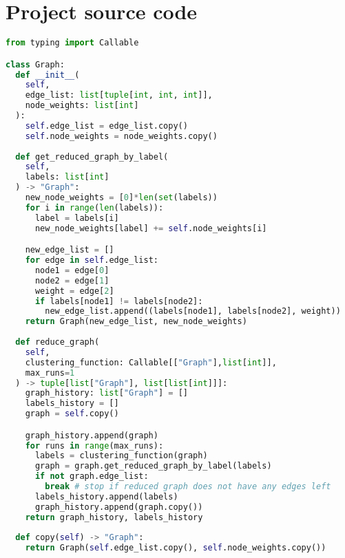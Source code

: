 \section{Project source code} \label{sec:project_source}
  \begin{lstlisting}[language=Python,caption=\texttt{graph.py},label=lst:graph.py]
from typing import Callable

class Graph:
  def __init__(
    self,
    edge_list: list[tuple[int, int, int]],
    node_weights: list[int]
  ):
    self.edge_list = edge_list.copy()
    self.node_weights = node_weights.copy()
  
  def get_reduced_graph_by_label(
    self,
    labels: list[int]
  ) -> "Graph":
    new_node_weights = [0]*len(set(labels))
    for i in range(len(labels)):
      label = labels[i]
      new_node_weights[label] += self.node_weights[i]

    new_edge_list = []
    for edge in self.edge_list:
      node1 = edge[0]
      node2 = edge[1]
      weight = edge[2]
      if labels[node1] != labels[node2]:
        new_edge_list.append((labels[node1], labels[node2], weight))
    return Graph(new_edge_list, new_node_weights)
  
  def reduce_graph(
    self,
    clustering_function: Callable[["Graph"],list[int]],
    max_runs=1
  ) -> tuple[list["Graph"], list[list[int]]]:
    graph_history: list["Graph"] = []
    labels_history = []
    graph = self.copy()

    graph_history.append(graph)
    for runs in range(max_runs):
      labels = clustering_function(graph)
      graph = graph.get_reduced_graph_by_label(labels)
      if not graph.edge_list:
        break # stop if reduced graph does not have any edges left
      labels_history.append(labels)
      graph_history.append(graph.copy())
    return graph_history, labels_history
  
  def copy(self) -> "Graph":
    return Graph(self.edge_list.copy(), self.node_weights.copy())
  \end{lstlisting}
